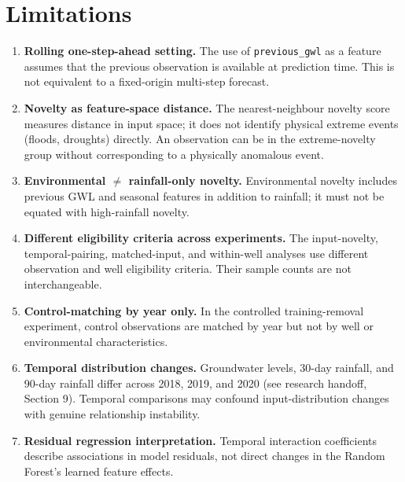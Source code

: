 \documentclass[conference]{IEEEtran}
\begin{document}
\section{Limitations}
\label{sec:limitations}

\begin{enumerate}
  \item \textbf{Rolling one-step-ahead setting.} The use of
        \texttt{previous\_gwl} as a feature assumes that the previous
        observation is available at prediction time.
        This is not equivalent to a fixed-origin multi-step forecast.

  \item \textbf{Novelty as feature-space distance.} The nearest-neighbour
        novelty score measures distance in input space; it does not
        identify physical extreme events (floods, droughts) directly.
        An observation can be in the extreme-novelty group without
        corresponding to a physically anomalous event.

  \item \textbf{Environmental $\neq$ rainfall-only novelty.}
        Environmental novelty includes previous GWL and seasonal
        features in addition to rainfall; it must not be equated with
        high-rainfall novelty.

  \item \textbf{Different eligibility criteria across experiments.}
        The input-novelty, temporal-pairing, matched-input, and
        within-well analyses use different observation and well
        eligibility criteria.
        Their sample counts are not interchangeable.

  \item \textbf{Control-matching by year only.} In the controlled
        training-removal experiment, control observations are matched
        by year but not by well or environmental characteristics.

  \item \textbf{Temporal distribution changes.} Groundwater levels, 30-day
        rainfall, and 90-day rainfall differ across 2018, 2019, and 2020
        (see research handoff, Section 9).
        Temporal comparisons may confound input-distribution changes with
        genuine relationship instability.

  \item \textbf{Residual regression interpretation.} Temporal interaction
        coefficients describe associations in model residuals, not direct
        changes in the Random Forest's learned feature effects.


\end{enumerate}
\end{document}
